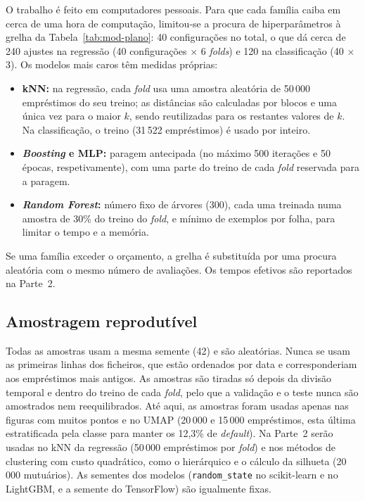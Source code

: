 O trabalho é feito em computadores pessoais. Para que cada família caiba em cerca de uma hora de computação, limitou-se a procura de hiperparâmetros à grelha da Tabela~\ref{tab:mod-plano}: 40 configurações no total, o que dá cerca de 240 ajustes na regressão (40 configurações $\times$ 6 \textit{folds}) e 120 na classificação (40 $\times$ 3). Os modelos mais caros têm medidas próprias:
\begin{itemize}
  \item \textbf{kNN:} na regressão, cada \textit{fold} usa uma amostra aleatória de 50\,000 empréstimos do seu treino; as distâncias são calculadas por blocos e uma única vez para o maior $k$, sendo reutilizadas para os restantes valores de $k$. Na classificação, o treino (31\,522 empréstimos) é usado por inteiro.
  \item \textbf{\textit{Boosting} e MLP:} paragem antecipada (no máximo 500 iterações e 50 épocas, respetivamente), com uma parte do treino de cada \textit{fold} reservada para a paragem.
  \item \textbf{\textit{Random Forest}:} número fixo de árvores (300), cada uma treinada numa amostra de 30\% do treino do \textit{fold}, e mínimo de exemplos por folha, para limitar o tempo e a memória.
\end{itemize}
Se uma família exceder o orçamento, a grelha é substituída por uma procura aleatória com o mesmo número de avaliações. Os tempos efetivos são reportados na Parte~2.


\subsection{Amostragem reprodutível}

Todas as amostras usam a mesma semente (42) e são aleatórias. Nunca se usam as primeiras linhas dos ficheiros, que estão ordenados por data e corresponderiam aos empréstimos mais antigos. As amostras são tiradas só depois da divisão temporal e dentro do treino de cada \textit{fold}, pelo que a validação e o teste nunca são amostrados nem reequilibrados. Até aqui, as amostras foram usadas apenas nas figuras com muitos pontos e no UMAP (20\,000 e 15\,000 empréstimos, esta última estratificada pela classe para manter os 12,3\% de \textit{default}). Na Parte~2 serão usadas no kNN da regressão (50\,000 empréstimos por \textit{fold}) e nos métodos de clustering com custo quadrático, como o hierárquico e o cálculo da silhueta (20\,000 mutuários). As sementes dos modelos (\texttt{random\_state} no scikit-learn e no LightGBM, e a semente do TensorFlow) são igualmente fixas.